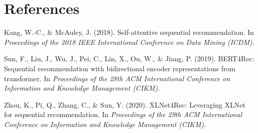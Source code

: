 \documentclass[12pt]{article}
\begin{document}
\section{References}

Kang, W.-C., \& McAuley, J. (2018). Self-attentive sequential recommendation. In \emph{Proceedings of the 2018 IEEE International Conference on Data Mining (ICDM)}.

Sun, F., Liu, J., Wu, J., Pei, C., Lin, X., Ou, W., \& Jiang, P. (2019). BERT4Rec: Sequential recommendation with bidirectional encoder representations from transformer. In \emph{Proceedings of the 28th ACM International Conference on Information and Knowledge Management (CIKM)}.

Zhou, K., Pi, Q., Zhang, C., \& Sun, Y. (2020). XLNet4Rec: Leveraging XLNet for sequential recommendation. In \emph{Proceedings of the 29th ACM International Conference on Information and Knowledge Management (CIKM)}.
\end{document}
